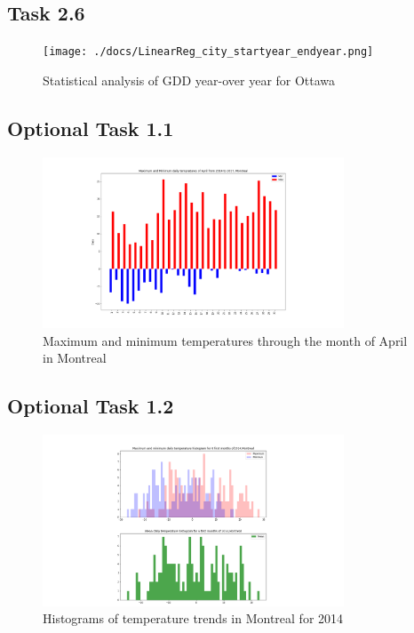 \documentclass[12pt]{article}
\begin{document}
\pagebreak
\subsection{Task 2.6}
\begin{figure}[!htbp]
\centering
\texttt{[image: ./docs/LinearReg\_city\_startyear\_endyear.png]} 
\caption{\scriptsize Statistical analysis of GDD year-over year for Ottawa}
\label{GDDregression}		  
\end{figure}

\pagebreak


\subsection{Optional Task 1.1}
\begin{figure}[!htbp]
\centering
\includegraphics[width=0.8\textwidth]{./docs/aprildaily.png} 
\caption{\scriptsize Maximum and minimum temperatures through the month of April in Montreal}
\label{Aprilmaxmin}		  
\end{figure}

\pagebreak

\subsection{Optional Task 1.2}
\begin{figure}[!htbp]
\centering
\includegraphics[width=0.8\textwidth]{./docs/histogram2014.png} 
\caption{\scriptsize Histograms of temperature trends in Montreal for 2014}
\label{hist2014}		  
\end{figure}
\end{document}
